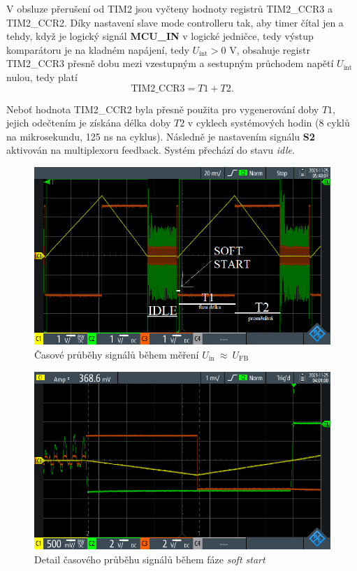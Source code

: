 \documentclass[twoside]{article}
\begin{document}
V obsluze přerušení od TIM2 jsou vyčteny hodnoty registrů TIM2\_CCR3 a TIM2\_CCR2. Díky nastavení slave mode controlleru tak, aby timer čítal jen a tehdy, když je logický signál \textbf{MCU\_IN}
v logické jedničce, tedy výstup komparátoru je na kladném napájení, tedy $U_{\text{int}} > 0$ V, obsahuje registr TIM2\_CCR3 přesně dobu mezi vzestupným a sestupným průchodem napětí $U_{\text{int}}$ nulou,
tedy platí
\begin{equation}
    \text{TIM2\_CCR3} = T1 + T2.
\end{equation}

Neboť hodnota TIM2\_CCR2 byla přesně použita pro vygenerování doby $T1$, jejich odečtením je získána délka doby $T2$ v cyklech systémových hodin (8 cyklů na mikrosekundu, 125 ns na cyklus).
Následně je nastavením signálu \textbf{S2} aktivován na multiplexoru feedback. Systém přechází do stavu \textit{idle}.


\begin{figure}[htbp]
    \centering
    \includegraphics[width=\linewidth]{overview.png}
    \caption{Časové průběhy signálů během měření $U_{\text{in}}~\approx~U_{\text{FB}}$}
    \label{fig:overview}
\end{figure}

\begin{figure}[htbp]
    \centering
    \includegraphics[width=\linewidth]{soft_start.png}
    \caption{Detail časového průběhu signálů během fáze \textit{soft start}}
    \label{fig:soft_start}
\end{figure}
\end{document}
